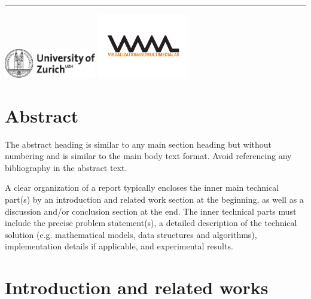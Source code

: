 \documentclass[11pt, a4paper,oneside,chapterprefix=false]{scrbook}
\begin{document}
\begin{titlepage}
	\vfill
	\hrule
	\vspace{0.5cm}
	\includegraphics*[width=0.3\textwidth]{figures/uzh_logo} \hfill
	\includegraphics*[width=0.3\textwidth]{figures/vmml_logo}
\end{titlepage}

\chapter{Abstract} \label{chp:abstract}

The abstract heading is similar to any main section heading but without numbering and is similar to the main body text format. Avoid referencing any bibliography in the abstract text.

A clear organization of a report typically encloses the inner main technical part(s) by an introduction and related work section at the beginning, as well as a discussion and/or conclusion section at the end. The inner technical parts must include the precise problem statement(s), a detailed description of the technical solution (e.g. mathematical models, data structures and algorithms), implementation details if applicable, and experimental results.


\tableofcontents

\mainmatter

\chapter{Introduction and related works} \label{chp:introduction}
\end{document}
